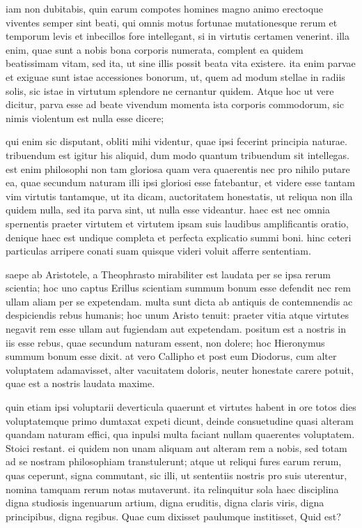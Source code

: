  iam non dubitabis, quin earum compotes homines magno animo erectoque viventes semper sint beati, qui omnis motus fortunae mutationesque rerum et temporum levis et inbecillos fore intellegant, si in virtutis certamen venerint. illa enim, quae sunt a nobis bona corporis numerata, complent ea quidem beatissimam vitam, sed ita, ut sine illis possit beata vita existere. ita enim parvae et exiguae sunt istae accessiones bonorum, ut, quem ad modum stellae in radiis solis, sic istae in virtutum splendore ne cernantur quidem. Atque hoc ut vere dicitur, parva esse ad beate vivendum momenta ista corporis commodorum, sic nimis violentum est nulla esse dicere;

 qui enim sic disputant, obliti mihi videntur, quae ipsi fecerint principia naturae. tribuendum est igitur his aliquid, dum modo quantum tribuendum sit intellegas. est enim philosophi non tam gloriosa quam vera quaerentis nec pro nihilo putare ea, quae secundum naturam illi ipsi gloriosi esse fatebantur, et videre esse tantam vim virtutis tantamque, ut ita dicam, auctoritatem honestatis, ut reliqua non illa quidem nulla, sed ita parva sint, ut nulla esse videantur. haec est nec omnia spernentis praeter virtutem et virtutem ipsam suis laudibus amplificantis oratio, denique haec est undique completa et perfecta explicatio summi boni. hinc ceteri particulas arripere conati suam quisque videri voluit afferre sententiam.

 saepe ab Aristotele, a Theophrasto mirabiliter est laudata per se ipsa rerum scientia; hoc uno captus Erillus scientiam summum bonum esse defendit nec rem ullam aliam per se expetendam. multa sunt dicta ab antiquis de contemnendis ac despiciendis rebus humanis; hoc unum Aristo tenuit: praeter vitia atque virtutes negavit rem esse ullam aut fugiendam aut expetendam. positum est a nostris in iis esse rebus, quae secundum naturam essent, non dolere; hoc Hieronymus summum bonum esse dixit. at vero Callipho et post eum Diodorus, cum alter voluptatem adamavisset, alter vacuitatem doloris, neuter honestate carere potuit, quae est a nostris laudata maxime.

 quin etiam ipsi voluptarii deverticula quaerunt et virtutes habent in ore totos dies voluptatemque primo dumtaxat expeti dicunt, deinde consuetudine quasi alteram quandam naturam effici, qua inpulsi multa faciant nullam quaerentes voluptatem. Stoici restant. ei quidem non unam aliquam aut alteram rem a nobis, sed totam ad se nostram philosophiam transtulerunt; atque ut reliqui fures earum rerum, quas ceperunt, signa commutant, sic illi, ut sententiis nostris pro suis uterentur, nomina tamquam rerum notas mutaverunt. ita relinquitur sola haec disciplina digna studiosis ingenuarum artium, digna eruditis, digna claris viris, digna principibus, digna regibus. Quae cum dixisset paulumque institisset, Quid est?

